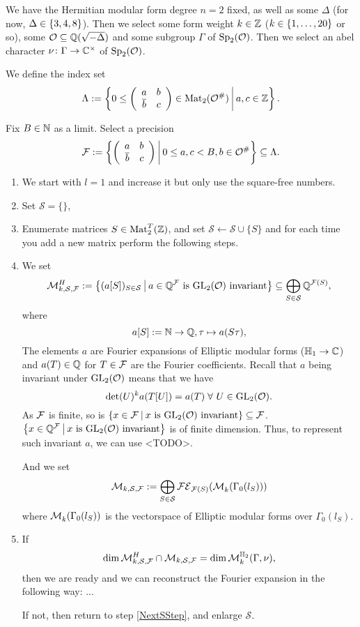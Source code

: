 \begin{algo}
We have the Hermitian modular form degree $n = 2$ fixed, as well as some $\Delta$ (for now, $\Delta \in \Set{3,4,8}$). Then we select some form weight $k \in \mathbb{Z}$ ($k \in \Set{1,\dots,20}$ or so), some $\mathcal{O} \subseteq \mathbb{Q}(\sqrt{-\Delta})$ and some subgroup $\Gamma$ of $\operatorname{Sp}_2(\mathcal{O})$. Then we select an abel character $\nu \colon \Gamma \rightarrow \mathbb{C}^\times$ of $\operatorname{Sp}_2(\mathcal{O})$.

We define the index set
\[ \Lambda := \Set{0 \le \SimpleMatrix{a}{b}{\overline b}{c} \in \M_2(\curlO^\#)}{a,c \in \Z } . \]

Fix $B \in \mathbb{N}$ as a limit. Select a precision
\[ \F := \Set{\SimpleMatrix{a}{b}{\overline b}{c}}{0 \le a , c < B, b \in \curlO^\#} \subseteq \Lambda . \]

\begin{enumerate}
\item We start with $l = 1$ and increase it but only use the square-free numbers.
\item Set $\mathcal{S} = \{\}$,
\item\label{NextSStep} Enumerate matrices $S \in \operatorname{Mat}_2^T(\mathbb{Z})$, and set $\mathcal{S} \leftarrow \mathcal{S} \cup \{ S \}$ and for each time you add a new matrix perform the following steps.


\item We set
\[ \mathcal{M}_{k,\mathcal{S},\F}^H := \Set{ (a [S])_{S\in\mathcal{S}} }{\text{$a \in \Q^\F$ is $\GL_2(\curlO)$ invariant}} \subseteq \bigoplus_{S\in\mathcal{S}} \Q^{\F(S)} , \]
where
\[ a[S] := \mathbb{N} \rightarrow \mathbb{Q}, \tau \mapsto a(S \tau), \]
The elements $a$ are Fourier expansions of Elliptic modular forms ($\mathbb{H}_1 \rightarrow \mathbb{C}$) and $a(T) \in \mathbb{Q}$ for $T \in \mathcal{F}$ are the Fourier coefficients.
Recall that $a$ being invariant under $\operatorname{GL}_2(\mathcal{O})$ means that we have
\[ \det(U)^k a(T[U]) = a(T) \; \forall\ U \in \operatorname{GL}_2(\mathcal{O}) . \]
As $\mathcal{F}$ is finite, so is $\invar{\F}{\GL_2(\curlO)} \subseteq \F$. $\invar{\Q^\F}{\GL_2(\curlO)}$ is of finite dimension.
Thus, to represent such invariant $a$, we can use <TODO>.


And we set
\[ \mathcal{M}_{k, \mathcal{S},\mathcal{F}} := \bigoplus_{S\in\mathcal{S}} \mathcal{FE}_{\mathcal{F}(S)}(\operatorname{\mathcal{M}}^{}_k (\Gamma_0(l_S))) \]
where $\operatorname{\mathcal{M}}^{}_k (\Gamma_0(l_S))$ is the vectorspace of Elliptic modular forms over $\Gamma_0(l_S)$. %

\item
If
\[ \dim \mathcal{M}_{k,\mathcal{S},\mathcal{F}}^H \cap \mathcal{M}_{k, \mathcal{S},\mathcal{F}}
= \dim \operatorname{\mathcal{M}}^{\mathbb{H}_{2}}_k (\Gamma,\nu) , \]
then we are ready and we can reconstruct the Fourier expansion in the following way: ...

If not, then return to step \ref{NextSStep}, and enlarge $\mathcal{S}$.
\end{enumerate}
\end{algo}

